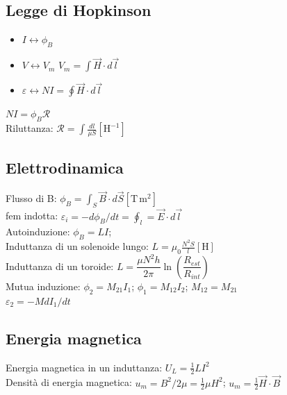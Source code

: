 \documentclass{book}
\begin{document}
\subsection*{Legge di Hopkinson}
\begin{itemize}
  \item $I \leftrightarrow \phi_B$ 
  \item $V \leftrightarrow V_m$ $V_m= \int \vec{H}\cdot d\vec{l}$
  \item $\varepsilon \leftrightarrow NI =  \oint \vec{H}\cdot d\vec{l}$
\end{itemize}
$NI = \phi_B \mathcal{R} $\\
Riluttanza: $\mathcal{R}=\int \frac{dl}{\mu S}\left[\mathrm{H^{-1}} \right] $
\subsection*{Elettrodinamica}
Flusso di B: $\phi_B = \int_S \vec{B}\cdot d\vec{S} \left[\mathrm{T\,m^2} \right]$\\
fem indotta: $\varepsilon_i= - d\phi_B/dt = \oint_l =\vec{E}\cdot d\vec{l}$\\
Autoinduzione: $\phi_B=LI$;\\
Induttanza di un solenoide lungo: 
$L=\mu_0 \frac{N^2 S}{l} \left[\mathrm{H} \right]$ \\
Induttanza di un toroide: 
$L = \dfrac{\mu N^2 h}{2\pi} \ln\left(\dfrac{R_{est}}{R_{int}}\right)$\\
Mutua induzione:
$\phi_2=M_{21}I_1$; 
$\phi_1=M_{12}I_2$; 
$M_{12}=M_{21}$\\
$\varepsilon_2=-M dI_1/dt$
\subsection*{Energia magnetica}
Energia magnetica in un induttanza:  $
U_L= \frac{1}{2}LI^2 $\\
Densità di energia magnetica: $u_m=B^2/2\mu = \frac{1}{2}\mu H^2$; 
$u_m = \frac{1}{2}\vec{H}\cdot \vec{B}$
\end{document}
